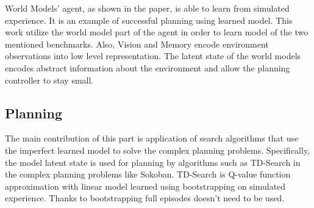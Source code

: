World Models' agent, as shown in the paper\cite{Algo.WorldModels}, is able to learn from simulated experience. It is an example of successful planning using learned model. This work utilize the world model part of the agent in order to learn model of the two mentioned benchmarks. Also, Vision and Memory encode environment observations into low level representation. The latent state of the world models encodes abstract information about the environment and allow the planning controller to stay small.


\subsection{Planning}

The main contribution of this part is application of search algorithms that use the imperfect learned model to solve the complex planning problems. Specifically, the model latent state is used for planning by algorithms such as TD-Search in the complex planning problems like Sokoban. TD-Search is Q-value function approximation with linear model learned using bootstrapping on simulated experience. Thanks to bootstrapping full episodes doesn’t need to be used.
